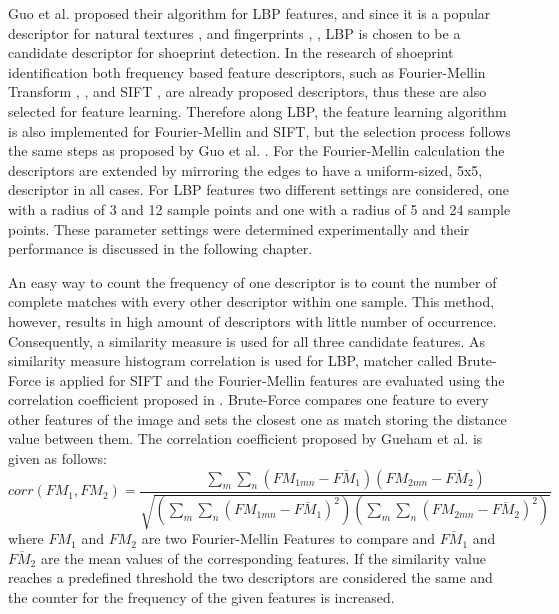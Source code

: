 \documentclass[draft,final]{vutinfth} %
\begin{document}
\par
Guo et al. \cite{guo2012discriminative} proposed their algorithm for LBP features, and since it is a popular descriptor for natural textures \cite{hong2014combining}, \cite{ahonen2009rotation} and fingerprints \cite{wang2013pixel}, \cite{rida2018palmprint}, LBP is chosen to be a candidate descriptor for shoeprint detection.
In the research of shoeprint identification both frequency based feature descriptors, such as Fourier-Mellin Transform \cite{wu2019crime}, \cite{gueham2008automatic}, and SIFT \cite{nibouche2009rotation}, \cite{richetelli2017classification} are already proposed descriptors, thus these are also selected for feature learning.
Therefore along LBP, the feature learning algorithm is also implemented for Fourier-Mellin and SIFT, but the selection process follows the same steps as proposed by Guo et al. \cite{guo2012discriminative}.
For the Fourier-Mellin calculation the descriptors are extended by mirroring the edges to have a uniform-sized, 5x5, descriptor in all cases.
For LBP features two different settings are considered, one with a radius of 3 and 12 sample points and one with a radius of 5 and 24 sample points.
These parameter settings were determined experimentally and their performance is discussed in the following chapter.
\par
An easy way to count the frequency  of one descriptor is to count the number of complete matches with every other descriptor within one sample.
This method, however, results in high amount of descriptors with little number of occurrence.
Consequently, a similarity measure is used for all three candidate features. 
As similarity measure histogram correlation is used for LBP, matcher called Brute-Force is applied for SIFT and the Fourier-Mellin features are evaluated using the correlation coefficient proposed  in \cite{gueham2008automatic}.
Brute-Force compares one feature to every other features of the image and sets the closest one as match storing the distance value between them.
The correlation coefficient proposed by Gueham et al. \cite{gueham2008automatic} is given as follows:
\[ corr(FM_{1},FM_{2}) = \frac{\sum\limits_{m}\sum\limits_{n}(FM_{1mn}-\overline{FM_{1}})(FM_{2mn}-\overline{FM_{2}})}{\sqrt{(\sum\limits_{m}\sum\limits_{n}(FM_{1mn}-\overline{FM_{1}})^2)(\sum\limits_{m}\sum\limits_{n}(FM_{2mn}-\overline{FM_{2}})^2)}}  \]
\label{FMcorr}
where $FM_{1}$ and $FM_{2}$ are two Fourier-Mellin Features to compare and $\overline{FM_{1}}$ and $\overline{FM_{2}}$ are the mean values of the corresponding features.
If the similarity value reaches a predefined threshold the two descriptors are considered the same and the counter for the frequency of the given features is increased.
\end{document}
